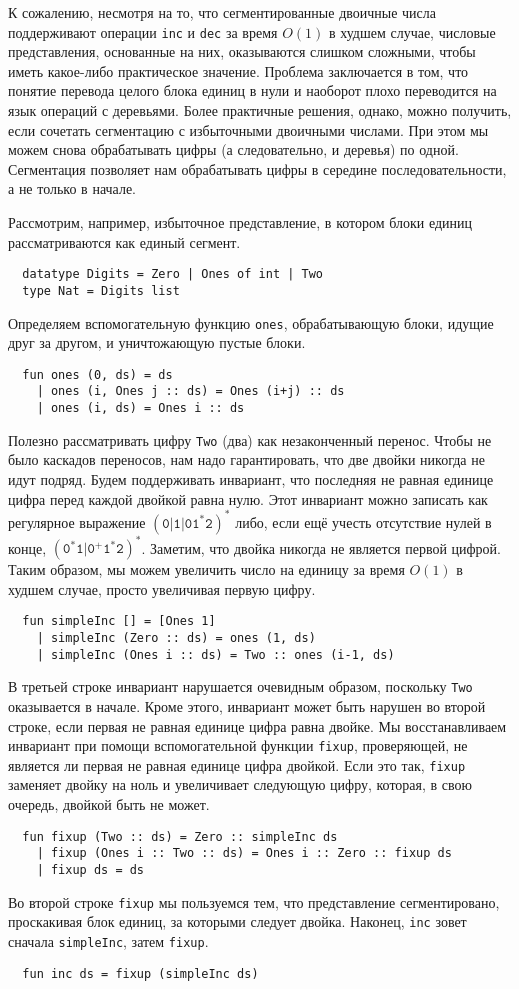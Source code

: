 К сожалению, несмотря на то, что сегментированные двоичные числа
поддерживают операции \lstinline!inc! и \lstinline!dec! за время
$O(1)$ в худшем случае, числовые представления, основанные на них,
оказываются слишком сложными, чтобы иметь какое-либо практическое
значение. Проблема заключается в том, что понятие перевода целого
блока единиц в нули и наоборот плохо переводится на язык операций с
деревьями. Более практичные решения, однако, можно получить, если
сочетать сегментацию с избыточными двоичными числами. При этом мы
можем снова обрабатывать цифры (а следовательно, и деревья) по
одной. Сегментация позволяет нам обрабатывать цифры в середине
последовательности, а не только в начале.

Рассмотрим, например, избыточное представление, в котором блоки единиц
рассматриваются как единый сегмент.
\begin{lstlisting}
  datatype Digits = Zero | Ones of int | Two
  type Nat = Digits list
\end{lstlisting}
Определяем вспомогательную функцию \lstinline!ones!, обрабатывающую
блоки, идущие друг за другом, и уничтожающую пустые блоки.
\begin{lstlisting}
  fun ones (0, ds) = ds
    | ones (i, Ones j :: ds) = Ones (i+j) :: ds
    | ones (i, ds) = Ones i :: ds
\end{lstlisting}
Полезно рассматривать цифру \lstinline!Two! (два) как незаконченный
перенос. Чтобы не было каскадов переносов, нам надо гарантировать, что
две двойки никогда не идут подряд. Будем поддерживать инвариант, что
последняя не равная единице цифра перед каждой двойкой равна
нулю. Этот инвариант можно записать как регулярное выражение
$\mathtt{(0|1|01^*2)^*}$ либо, если ещё учесть отсутствие нулей в
конце, $\mathtt{(0^*1 | 0^+1^*2)^*}$. Заметим, что двойка никогда не
является первой цифрой. Таким образом, мы можем увеличить число на
единицу за время $O(1)$ в худшем случае, просто увеличивая первую
цифру.
\begin{lstlisting}
  fun simpleInc [] = [Ones 1]
    | simpleInc (Zero :: ds) = ones (1, ds)
    | simpleInc (Ones i :: ds) = Two :: ones (i-1, ds)
\end{lstlisting}
В третьей строке инвариант нарушается очевидным образом, поскольку
\lstinline!Two! оказывается в начале. Кроме этого, инвариант может
быть нарушен во второй строке, если первая не равная единице цифра
равна двойке. Мы восстанавливаем инвариант при помощи вспомогательной
функции \lstinline!fixup!, проверяющей, не является ли первая не
равная единице цифра двойкой. Если это так, \lstinline!fixup! заменяет
двойку на ноль и увеличивает следующую цифру, которая, в свою очередь,
двойкой быть не может.
\begin{lstlisting}
  fun fixup (Two :: ds) = Zero :: simpleInc ds
    | fixup (Ones i :: Two :: ds) = Ones i :: Zero :: fixup ds
    | fixup ds = ds
\end{lstlisting}
Во второй строке \lstinline!fixup! мы пользуемся тем, что представление
сегментировано, проскакивая блок единиц, за которыми следует
двойка. Наконец, \lstinline!inc! зовет сначала \lstinline!simpleInc!,
затем \lstinline!fixup!.
\begin{lstlisting}
  fun inc ds = fixup (simpleInc ds)
\end{lstlisting}

